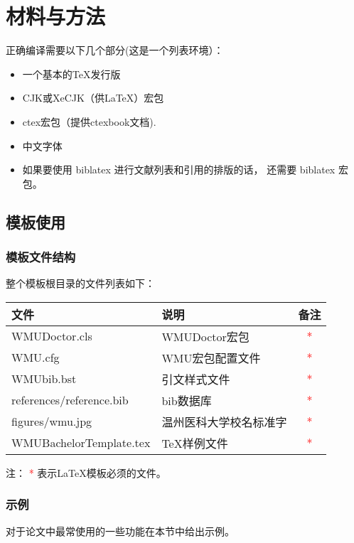 \chapter{材料与方法}

正确编译需要以下几个部分(这是一个列表环境）：
\begin{itemize}
    \item 一个基本的\TeX{}发行版
    \item CJK或XeCJK（供\LaTeX{}）宏包
    \item ctex宏包（提供ctexbook文档).
    \item 中文字体
    \item 如果要使用 biblatex 进行文献列表和引用的排版的话， 还需要 biblatex 宏包。
\end{itemize}

\section{模板使用}
\subsection{模板文件结构\label{sec:files}}
整个模板根目录的文件列表如下：
\begin{center}
    \begin{tabular}{llc}
        \toprule
        文件                     & 说明                   & 备注                 \\
        \midrule
        WMUDoctor.cls            & WMUDoctor宏包          & \textcolor{red}{{*}} \\
        WMU.cfg                  & WMU宏包配置文件        & \textcolor{red}{{*}} \\
        WMUbib.bst               & 引文样式文件           & \textcolor{red}{{*}} \\
        references/reference.bib & bib数据库              & \textcolor{red}{{*}} \\
        figures/wmu.jpg          & 温州医科大学校名标准字 & \textcolor{red}{{*}} \\
        WMUBachelorTemplate.tex  & \TeX{}样例文件         & \textcolor{red}{{*}} \\
        \bottomrule
    \end{tabular}
\end{center}
注： \textcolor{red}{{*}} 表示\LaTeX{}模板必须的文件。
\subsection{示例}
对于论文中最常使用的一些功能在本节中给出示例。
